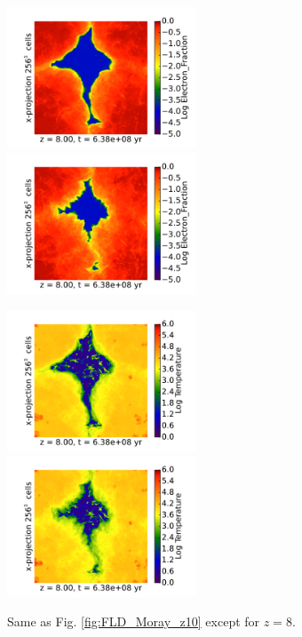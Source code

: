 \begin{figure}[t]
\centerline{\hfill
  \includegraphics[width=0.5\textwidth]{proj_Electron_Fraction_wDensity_x_RD0003.pdf}
  \includegraphics[width=0.5\textwidth]{proj_Electron_Fraction_wDensity_x_RedshiftOutput0005.pdf}
  \hfill}
\centerline{\hfill
  \includegraphics[width=0.5\textwidth]{proj_Temperature_wDensity_x_RD0003.pdf}
  \includegraphics[width=0.5\textwidth]{proj_Temperature_wDensity_x_RedshiftOutput0005.pdf}
  \hfill}
  \caption{Same as Fig. \ref{fig:FLD_Moray_z10} except for $z=8$.}
  \label{fig:FLD_Moray_z8}
\end{figure}



